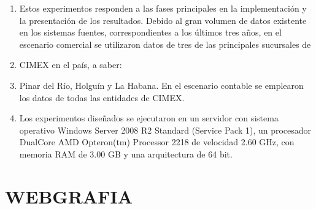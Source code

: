 \documentclass{article} %
\begin{document}
\begin{enumerate}
\item  Estos experimentos responden a las fases principales en la implementaci\'{o}n y la presentaci\'{o}n de los resultados. Debido al gran volumen de datos existente en los sistemas fuentes, correspondientes a los \'{u}ltimos tres a\~{n}os, en el escenario comercial se utilizaron datos de tres de las principales sucursales de 

\item  CIMEX en el pa\'{i}s, a saber:

\item  Pinar del R\'{i}o, Holgu\'{i}n y La Habana. En el escenario contable se emplearon los datos de todas las entidades de CIMEX.

\item  Los experimentos dise\~{n}ados se ejecutaron en un servidor con sistema operativo Windows Server 2008 R2 Standard (Service Pack 1), un procesador DualCore AMD Opteron(tm) Processor 2218 de velocidad 2.60 GHz, con memoria RAM de 3.00 GB y una arquitectura de 64 bit.
\end{enumerate}

\noindent 

\noindent 

\noindent 

\noindent 

\noindent 

\noindent 

\noindent 

\noindent 

\noindent 

\noindent 

\noindent 

\noindent 

\noindent 

\noindent 

\noindent 

\noindent 

\noindent 

\noindent 
\section{WEBGRAFIA}

\noindent 
\end{document}
